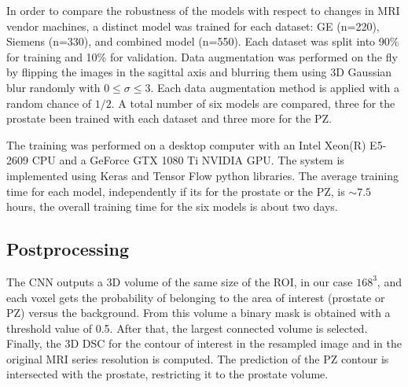 In order to compare the robustness of the models with respect to changes in MRI vendor machines,  a distinct model was trained for each dataset: GE (n=220), Siemens (n=330), and combined model (n=550). Each dataset was split into 90\% for training and 10\% for validation. Data augmentation was performed on the fly by flipping the images in the sagittal axis and blurring them using 3D Gaussian blur randomly with $0 \leq \sigma \leq 3$. Each data augmentation method is applied with a random chance of $1/2$.  
A total number of six models are compared, three for the prostate been trained with each dataset and three more for the PZ. 

The training was performed on a desktop computer with an Intel Xeon(R) E5-2609 CPU and a GeForce GTX 1080 Ti NVIDIA GPU. The system is implemented using Keras \cite{chollet2015} and Tensor Flow \cite{tensorflow2015-whitepaper} python libraries. The average training time for each model, independently if its for the prostate or the PZ, is $\sim 7.5$ hours, the overall training time for the six models is about two days.

\subsection{Postprocessing}
The CNN outputs a 3D volume of the same size of the ROI, in our case $168^3$, and each voxel gets the probability of belonging to the area of interest (prostate or PZ) versus the background. From this volume a binary mask is obtained with a threshold value of 0.5. After that, the largest connected volume is selected. Finally, the 3D DSC for the contour of interest in the resampled image and in the original MRI series resolution is computed. The prediction of the PZ contour is intersected with the prostate, restricting it to the prostate volume.